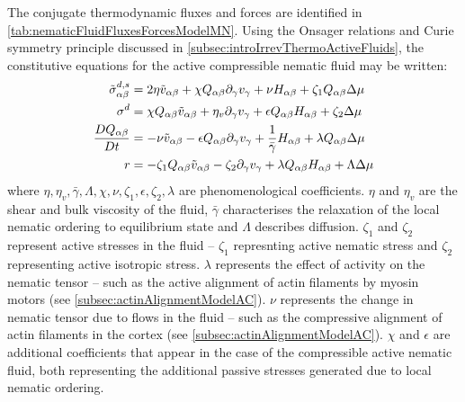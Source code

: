 The conjugate thermodynamic fluxes and forces are identified in \autoref{tab:nematicFluidFluxesForcesModelMN}. Using the Onsager relations and Curie symmetry principle discussed in \autoref{subsec:introIrrevThermoActiveFluids}, the constitutive equations for the active compressible nematic fluid may be written:
\begin{subequations}\label{eq:constitutiveEqActiveNematicGenericModelMN}
    \begin{align}
        \Tilde{\sigma}^{d,s}_{\alpha\beta} &= 2\eta \Tilde{v}_{\alpha\beta} + \chi Q_{\alpha\beta}\inlinePartial{\gamma}{v_\gamma} + \nu H_{\alpha\beta} + \zeta_1 Q_{\alpha\beta}\Delta\mu \\
        \sigma^d &= \chi Q_{\alpha\beta}\Tilde{v}_{\alpha\beta} + \eta_v \inlinePartial{\gamma}{v_\gamma} + \epsilon Q_{\alpha\beta}H_{\alpha\beta} + \zeta_2 \Delta\mu\\
        \frac{DQ_{\alpha\beta}}{Dt} &= -\nu \Tilde{v}_{\alpha\beta} - \epsilon Q_{\alpha\beta}\inlinePartial{\gamma}{v_\gamma} + \frac{1}{\bar{\gamma}} H_{\alpha\beta} + \lambda Q_{\alpha\beta}\Delta\mu\\
        r &= -\zeta_1 Q_{\alpha\beta}\Tilde{v}_{\alpha\beta} - \zeta_2\inlinePartial{\gamma}{v_\gamma} + \lambda Q_{\alpha\beta}H_{\alpha\beta} + \Lambda\Delta\mu
    \end{align}
\end{subequations}
where $\eta, \eta_v, \bar{\gamma}, \Lambda, \chi, \nu, \zeta_1, \epsilon, \zeta_2, \lambda$ are phenomenological coefficients. $\eta$ and $\eta_v$ are the shear and bulk viscosity of the fluid, $\bar{\gamma}$ characterises the relaxation of the local nematic ordering to equilibrium state and $\Lambda$ describes diffusion. $\zeta_1$ and $\zeta_2$ represent active stresses in the fluid -- $\zeta_1$ represnting active nematic stress and $\zeta_2$ representing active isotropic stress. $\lambda$ represents the effect of activity on the nematic tensor -- such as the active alignment of actin filaments by myosin motors \citep{reymann2016cortical} (see \autoref{subsec:actinAlignmentModelAC}). $\nu$ represents the change in nematic tensor due to flows in the fluid -- such as the compressive alignment of actin filaments in the cortex \citep{reymann2016cortical} (see \autoref{subsec:actinAlignmentModelAC}). $\chi$ and $\epsilon$ are additional coefficients that appear in the case of the compressible active nematic fluid, both representing the additional passive stresses generated due to local nematic ordering.

